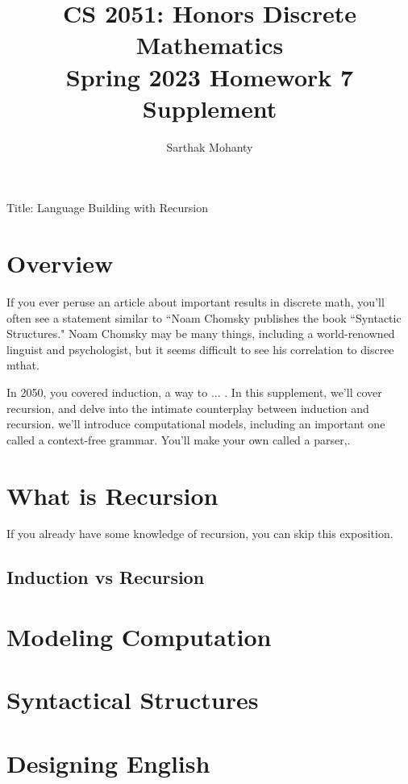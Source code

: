 \documentclass{article}
\title{\vspace{-1cm}CS 2051: Honors Discrete Mathematics \\Spring 2023 Homework 7 Supplement}
\author{Sarthak Mohanty }
\date{}
\begin{document}
\maketitle


Title: Language Building with Recursion

\section*{Overview}

If you ever peruse an article about important results in discrete math, you'll often see a statement similar to ``Noam Chomsky publishes the book “Syntactic Structures."  Noam Chomsky may be many things, including a world-renowned linguist and psychologist, but it seems difficult to see his correlation to discree mthat.

In 2050, you covered induction, a way to ... . In this supplement, we'll cover recursion, and delve into the intimate counterplay between induction and recursion. we'll introduce computational models, including an important one called a context-free grammar. You'll make your own called a parser,.

\section*{What is Recursion}

If you already have some knowledge of recursion, you can skip this exposition.
\subsection*{Induction vs Recursion}


\section*{Modeling Computation}


\section*{Syntactical Structures}

\section*{Designing English}
\end{document}
